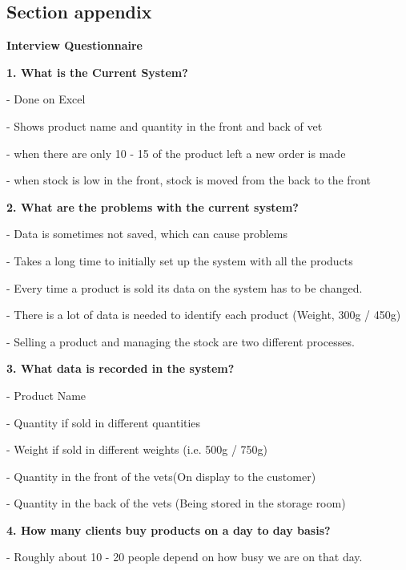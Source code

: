 \subsection{Section appendix}

\begin{center}

\textbf{Interview Questionnaire}

\end{center}

\begin{flushleft}

\textbf{1. What is the Current System?} \par
- Done on Excel\par
- Shows product name and quantity in the front and back of vet\par
- when there are only 10 - 15 of the product left a new order is made\par
- when stock is low in the front, stock is moved from the back to the front\par

\textbf{2. What are the problems with the current system?}\par
- Data is sometimes not saved, which can cause problems\par
- Takes a long time to initially set up the system with all the products\par
- Every time a product is sold its data on the system has to be changed.\par
- There is a lot of data is needed to identify each product (Weight, 300g / 450g)\par
- Selling a product and managing the stock are two different processes.\par

\textbf{3. What data is recorded in the system?}\par
- Product Name\par
- Quantity if sold in different quantities\par
- Weight if sold in different weights (i.e. 500g / 750g)\par
- Quantity in the front of the vets(On display to the customer)\par
- Quantity in the back of the vets (Being stored in the storage room)\par

\textbf{4. How many clients buy products on a day to day basis?}\par
- Roughly about 10 - 20 people depend on how busy we are on that day.\par


\end{flushleft}
